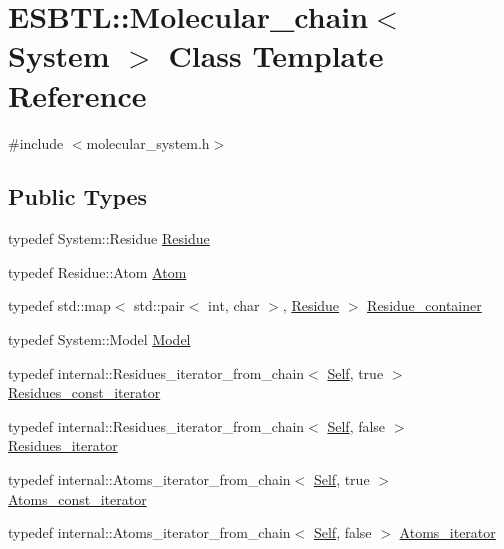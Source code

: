 \hypertarget{classESBTL_1_1Molecular__chain}{}\section{E\+S\+B\+TL\+:\+:Molecular\+\_\+chain$<$ System $>$ Class Template Reference}
\label{classESBTL_1_1Molecular__chain}


{\ttfamily \#include $<$molecular\+\_\+system.\+h$>$}

\subsection*{Public Types}
\begin{DoxyCompactItemize}
\item 
typedef System\+::\+Residue \hyperlink{classESBTL_1_1Molecular__chain_a59b61e0ecde5fb4c3d1765a37c9cf6cb}{Residue}
\item 
typedef Residue\+::\+Atom \hyperlink{classESBTL_1_1Molecular__chain_a53b9fe27aadbda89ae35802db0493405}{Atom}
\item 
typedef std\+::map$<$ std\+::pair$<$ int, char $>$, \hyperlink{classESBTL_1_1Molecular__chain_a59b61e0ecde5fb4c3d1765a37c9cf6cb}{Residue} $>$ \hyperlink{classESBTL_1_1Molecular__chain_a23f0241e8d12867ed7eb6f1ed862e2ef}{Residue\+\_\+container}
\item 
typedef System\+::\+Model \hyperlink{classESBTL_1_1Molecular__chain_a91de91fd0923cf2e00d947b76851be68}{Model}
\item 
typedef internal\+::\+Residues\+\_\+iterator\+\_\+from\+\_\+chain$<$ \hyperlink{classESBTL_1_1Molecular__chain}{Self}, true $>$ \hyperlink{group__grp__iters_ga4cadd9ac293bcd967a86f97bfc626a7f}{Residues\+\_\+const\+\_\+iterator}
\item 
typedef internal\+::\+Residues\+\_\+iterator\+\_\+from\+\_\+chain$<$ \hyperlink{classESBTL_1_1Molecular__chain}{Self}, false $>$ \hyperlink{group__grp__iters_gaccad04117ad7c730e41bdb9aeab8f116}{Residues\+\_\+iterator}
\item 
typedef internal\+::\+Atoms\+\_\+iterator\+\_\+from\+\_\+chain$<$ \hyperlink{classESBTL_1_1Molecular__chain}{Self}, true $>$ \hyperlink{group__grp__iters_gad872d386b268126c9bb2a2127a6a7254}{Atoms\+\_\+const\+\_\+iterator}
\item 
typedef internal\+::\+Atoms\+\_\+iterator\+\_\+from\+\_\+chain$<$ \hyperlink{classESBTL_1_1Molecular__chain}{Self}, false $>$ \hyperlink{group__grp__iters_gab2ee52ce4f9b656648669214cc44a4ea}{Atoms\+\_\+iterator}
\end{DoxyCompactItemize}
